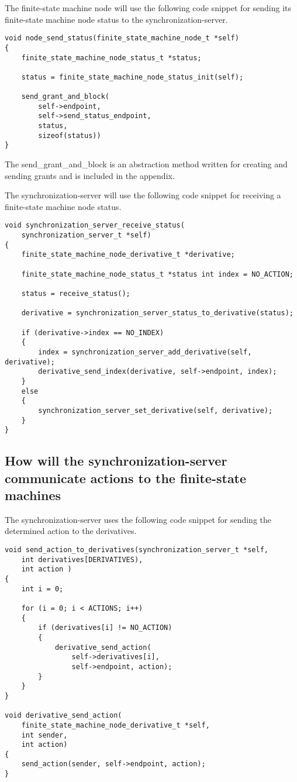 The finite-state machine node will use the following code snippet for
sending its finite-state machine node status to the
synchronization-server.

\begin{verbatim}
void node_send_status(finite_state_machine_node_t *self)
{
    finite_state_machine_node_status_t *status;

    status = finite_state_machine_node_status_init(self);

    send_grant_and_block(
        self->endpoint,
        self->send_status_endpoint,
        status,
        sizeof(status))
}
\end{verbatim}

The send\_grant\_and\_block is an abstraction method written for
creating and sending grants and is included in the appendix.

The synchronization-server will use the following code snippet for
receiving a finite-state machine node status.

\begin{verbatim}
void synchronization_server_receive_status(
    synchronization_server_t *self)
{
    finite_state_machine_node_derivative_t *derivative;

    finite_state_machine_node_status_t *status int index = NO_ACTION;

    status = receive_status();

    derivative = synchronization_server_status_to_derivative(status);

    if (derivative->index == NO_INDEX)
    {
        index = synchronization_server_add_derivative(self, derivative);
        derivative_send_index(derivative, self->endpoint, index);
    }
    else
    {
        synchronization_server_set_derivative(self, derivative);
    }
}
\end{verbatim}

\hypertarget{how-will-the-synchronization-server-communicate-actions-to-the-finite-state-machines}{%
\subsection{How will the synchronization-server communicate actions to
the finite-state
machines}\label{how-will-the-synchronization-server-communicate-actions-to-the-finite-state-machines}}

The synchronization-server uses the following code snippet for sending
the determined action to the derivatives.

\begin{verbatim}
void send_action_to_derivatives(synchronization_server_t *self,
    int derivatives[DERIVATIVES),
    int action )
{
    int i = 0;

    for (i = 0; i < ACTIONS; i++)
    {
        if (derivatives[i] != NO_ACTION)
        {
            derivative_send_action(
                self->derivatives[i], 
                self->endpoint, action);
        }
    }
}

void derivative_send_action(
    finite_state_machine_node_derivative_t *self,
    int sender,
    int action)
{
    send_action(sender, self->endpoint, action);
}
\end{verbatim}

